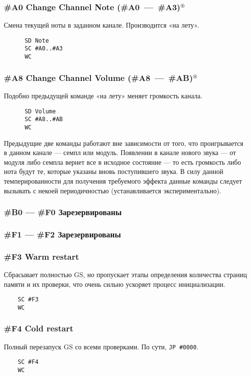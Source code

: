 \documentclass[a4paper,11pt]{article}
\DeclareRobustCommand{\Cyrax}{\texorpdfstring{\(^\circledast\)}{\circledast}}
\begin{document}
\subsubsection{\#A0 Change Channel Note (\#A0~---~\#A3)\Cyrax}
Смена текущей ноты в заданном канале. Производится «на лету».
\begin{verbatim}
      SD Note
      SC #A0..#A3
      WC
\end{verbatim}

\subsubsection{\#A8 Change Channel Volume (\#A8~---~\#AB)\Cyrax}
Подобно предыдущей команде «на лету» меняет громкость канала.
\begin{verbatim}
      SD Volume
      SC #A8..#AB
      WC
\end{verbatim}
Предыдущие две команды работают вне зависимости от того, что проигрывается в данном канале --- семпл или модуль. Появлении в канале нового звука — от модуля либо семпла вернет все в исходное состояние — то есть громкость либо нота будут те, которые указаны вновь поступившего звука. В силу данной темперированности для получения требуемого эффекта данные команды следует вызывать с некоей периодичностью (устанавливается экспериментально).

\subsubsection{\#B0 --- \#F0 Зарезервированы}

\subsubsection{\#F1 --- \#F2 Зарезервированы}
\subsubsection{\#F3 Warm restart\label{cmd:F3}}
Сбрасывает полностью GS, но пропускает этапы определения количества страниц памяти и их проверки, что очень сильно ускоряет процесс инициализации.
\begin{verbatim}
    SC #F3
    WC
\end{verbatim}

\subsubsection{\#F4 Cold restart\label{cmd:F4}}
Полный перезапуск GS со всеми проверками. По сути, \texttt{JP \#0000}.
\begin{verbatim}
    SC #F4
    WC
\end{verbatim}
\end{document}
